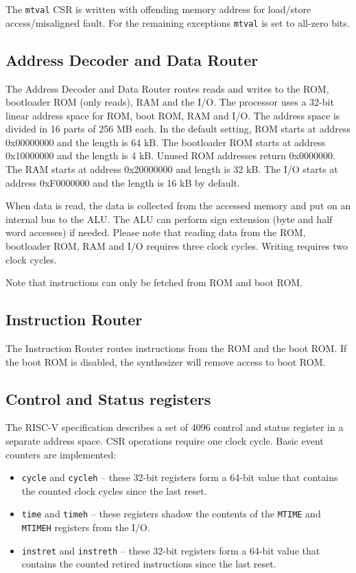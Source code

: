 \documentclass[12pt]{article}
\begin{document}
The \lstinline|mtval| CSR is written with offending memory address for load/store access/misaligned fault. For the remaining exceptions \lstinline|mtval| is set to all-zero bits.

\subsection{Address Decoder and Data Router}
\label{sec:addressdecoderanddatarouter}
The Address Decoder and Data Router routes reads and writes to the ROM, bootloader ROM (only reads), RAM and the I/O. The processor uses a 32-bit linear address space for ROM, boot ROM, RAM and I/O. The address space is divided in 16 parts of 256 MB each. In the default setting, ROM starts at address 0x00000000 and the length is 64 kB. The bootloader ROM starts at address 0x10000000 and the length is 4 kB. Unused ROM addresses return 0x0000000. The RAM starts at address 0x20000000 and length is 32 kB. The I/O starts at address 0xF0000000 and the length is 16 kB by default.

When data is read, the data is collected from the accessed memory and put on an internal bus to the ALU. The ALU can perform sign extension (byte and half word accesses) if needed. Please note that reading data from the ROM, bootloader ROM, RAM and I/O requires three clock cycles. Writing requires two clock cycles.

Note that instructions can only be fetched from ROM and boot ROM.

\subsection{Instruction Router}
The Instruction Router routes instructions from the ROM and the boot ROM. If the boot ROM is disabled, the synthesizer will remove access to boot ROM.

\subsection{Control and Status registers}
The RISC-V specification describes a set of 4096 control and status register in a separate address space. CSR operations require one clock cycle. Basic event counters are implemented:

\begin{itemize}
\item \lstinline|cycle| and \lstinline|cycleh| -- these 32-bit registers form a 64-bit value that contains the counted clock cycles since the last reset.
\item \lstinline|time| and \lstinline|timeh| -- these registers shadow the contents of the \lstinline|MTIME| and \lstinline|MTIMEH| registers from the I/O.
\item \lstinline|instret| and \lstinline|instreth| -- these 32-bit registers form a 64-bit value that contains the counted retired instructions since the last reset.
\end{itemize}
\end{document}
